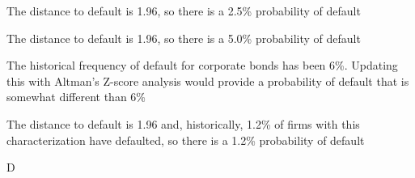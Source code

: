 \documentclass{article}
\begin{document}
\begin{choices}
    \item The distance to default is 1.96, so there is a 2.5\% probability of default
    \item The distance to default is 1.96, so there is a 5.0\% probability of default
    \item The historical frequency of default for corporate bonds has been 6\%. Updating this with Altman's Z-score analysis would provide a probability of default that is somewhat different than 6\%
    \item The distance to default is 1.96 and, historically, 1.2\% of firms with this characterization have defaulted, so there is a 1.2\% probability of default
\end{choices}

\begin{correctanswer}
    D
\end{correctanswer}
\end{document}
